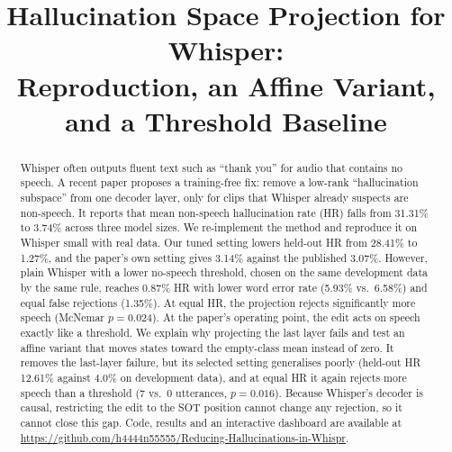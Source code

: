\documentclass[conference,a4paper]{IEEEtran}
\newcommand{\repo}{\url{https://github.com/h4444n55555/Reducing-Hallucinations-in-Whispr}}
\begin{document}
\title{Hallucination Space Projection for Whisper:\\
Reproduction, an Affine Variant,\\ and a Threshold Baseline}

\author{%
\and
{}
}

\maketitle

\begin{abstract}
Whisper often outputs fluent text such as ``thank you'' for audio that contains no speech. A recent paper proposes a training-free fix: remove a low-rank ``hallucination subspace'' from one decoder layer, only for clips that Whisper already suspects are non-speech. It reports that mean non-speech hallucination rate (HR) falls from 31.31\% to 3.74\% across three model sizes. We re-implement the method and reproduce it on Whisper small with real data. Our tuned setting lowers held-out HR from 28.41\% to 1.27\%, and the paper's own setting gives 3.14\% against the published 3.07\%. However, plain Whisper with a lower no-speech threshold, chosen on the same development data by the same rule, reaches 0.87\% HR with lower word error rate (5.93\% vs.\ 6.58\%) and equal false rejections (1.35\%). At equal HR, the projection rejects significantly more speech (McNemar $p = 0.024$). At the paper's operating point, the edit acts on speech exactly like a threshold. We explain why projecting the last layer fails and test an affine variant that moves states toward the empty-class mean instead of zero. It removes the last-layer failure, but its selected setting generalises poorly (held-out HR 12.61\% against 4.0\% on development data), and at equal HR it again rejects more speech than a threshold (7 vs.\ 0 utterances, $p = 0.016$). Because Whisper's decoder is causal, restricting the edit to the SOT position cannot change any rejection, so it cannot close this gap. Code, results and an interactive dashboard are available at \repo.
\end{abstract}
\end{document}
